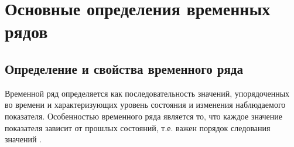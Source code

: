 \linespread{1.15}\selectfont

\chapter{Основные определения временных рядов}

\section{Определение и свойства временного ряда}
Временной ряд определяется как последовательность значений, упорядоченных во времени и характеризующих уровень состояния и изменения наблюдаемого показателя.
Особенностью временного ряда является то, что каждое значение показателя зависит от прошлых состояний, т.е. важен порядок следования значений .

